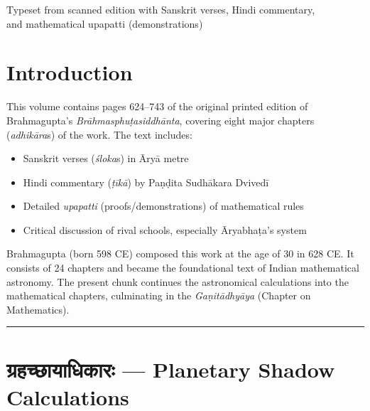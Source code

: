 \documentclass[11pt,a4paper]{article}
\newcommand{\dev}[1]{{\devanagarifont #1}}
\begin{document}
\begin{titlepage}
\begin{center}
\vfill

{\small Typeset from scanned edition with Sanskrit verses, Hindi commentary,\\
and mathematical upapatti (demonstrations)}

\end{center}
\end{titlepage}

\tableofcontents
\newpage

\section*{Introduction}

This volume contains pages 624–743 of the original printed edition of Brahmagupta's \textit{Brāhmasphuṭasiddhānta}, covering eight major chapters (\textit{adhikāra}s) of the work. The text includes:

\begin{itemize}[leftmargin=2em]
  \item Sanskrit verses (\textit{śloka}s) in Āryā metre
  \item Hindi commentary (\textit{ṭīkā}) by Paṇḍita Sudhākara Dvivedī
  \item Detailed \textit{upapatti} (proofs/demonstrations) of mathematical rules
  \item Critical discussion of rival schools, especially Āryabhaṭa's system
\end{itemize}

Brahmagupta (born 598 CE) composed this work at the age of 30 in 628 CE. It consists of 24 chapters and became the foundational text of Indian mathematical astronomy. The present chunk continues the astronomical calculations into the mathematical chapters, culminating in the \textit{Gaṇitādhyāya} (Chapter on Mathematics).

\medskip
\noindent\rule{\textwidth}{0.4pt}


\section[ग्रहच्छायाधिकारः]{\dev{ग्रहच्छायाधिकारः} — Planetary Shadow Calculations}
\label{sec:grahacchaya}
\end{document}
